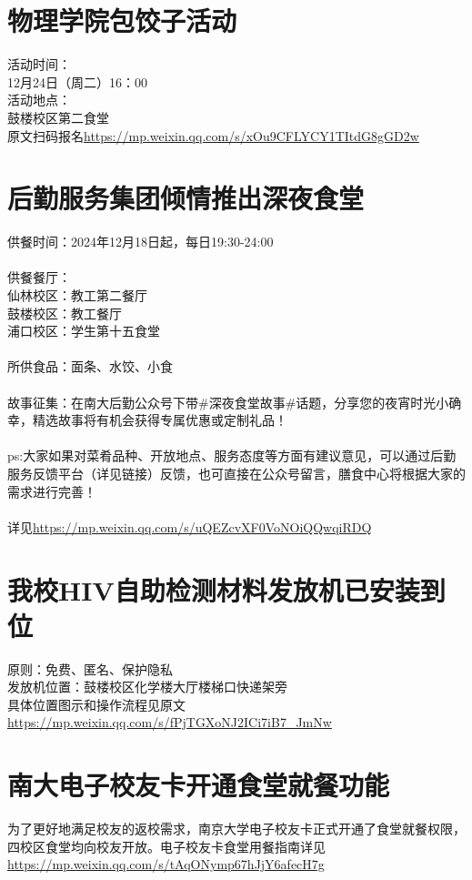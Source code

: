 \documentclass[letterpaper, 12pt]{article}
\begin{document}
\begin{multicols}{2}
\section{物理学院包饺子活动}
活动时间：\\
12月24日（周二）16：00\\
活动地点：\\
鼓楼校区第二食堂\\
原文扫码报名\url{https://mp.weixin.qq.com/s/xOu9CFLYCY1TItdG8gGD2w}

\section{后勤服务集团倾情推出深夜食堂}
供餐时间：2024年12月18日起，每日19:30-24:00\\\\
供餐餐厅：\\
仙林校区：教工第二餐厅\\
鼓楼校区：教工餐厅\\
浦口校区：学生第十五食堂\\\\
所供食品：面条、水饺、小食\\\\
故事征集：在南大后勤公众号下带\#深夜食堂故事\#话题，分享您的夜宵时光小确幸，精选故事将有机会获得专属优惠或定制礼品！\\\\
ps:大家如果对菜肴品种、开放地点、服务态度等方面有建议意见，可以通过后勤服务反馈平台（详见链接）反馈，也可直接在公众号留言，膳食中心将根据大家的需求进行完善！\\\\
详见\url{https://mp.weixin.qq.com/s/uQEZcvXF0VoNOiQQwqiRDQ}
\section{我校HIV自助检测材料发放机已安装到位}
原则：免费、匿名、保护隐私\\
发放机位置：鼓楼校区化学楼大厅楼梯口快递架旁\\
具体位置图示和操作流程见原文\url{https://mp.weixin.qq.com/s/fPjTGXoNJ2ICi7iB7_JmNw}\\

\section{南大电子校友卡开通食堂就餐功能}
为了更好地满足校友的返校需求，南京大学电子校友卡正式开通了食堂就餐权限，四校区食堂均向校友开放。电子校友卡食堂用餐指南详见\url{https://mp.weixin.qq.com/s/tAqONymp67hJjY6afecH7g}


\end{multicols} 
\end{document}
